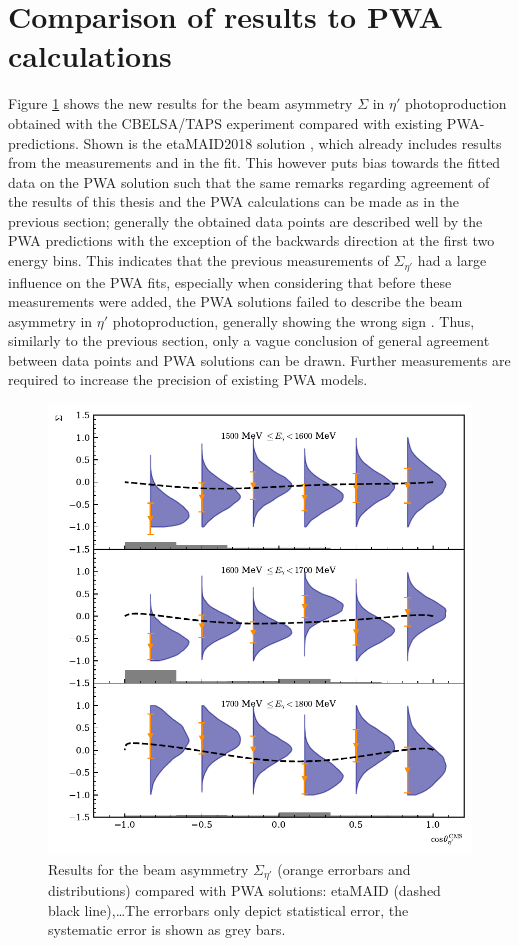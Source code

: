 \section{Comparison of results to PWA calculations}
Figure \ref{fig:pwa} shows the new results for the beam asymmetry $\Sigma$ in $\eta'$ photoproduction obtained with the CBELSA/TAPS experiment compared with existing PWA-predictions. Shown is the etaMAID2018 solution \cite{etaMAID}, which already includes results from the measurements \cite{collins} and \cite{thresh} in the fit. This however puts bias towards  the fitted data on the PWA solution such that the same remarks regarding agreement of the results of this thesis and the PWA calculations can be made as in the previous section; generally the obtained data points are described well by the PWA predictions with the exception of the backwards direction at the first two energy bins. This indicates that the previous measurements of $\Sigma_{\eta'}$ had a large influence on the PWA fits, especially when considering that before these measurements were added, the PWA solutions failed to describe the beam asymmetry in $\eta'$ photoproduction, generally showing the wrong sign \cite{collins}. Thus, similarly to the previous section, only a vague conclusion of general agreement between data points and PWA solutions can be drawn. Further measurements are required to increase the precision of existing PWA models.

\begin{figure}[htbp]
\centering
\includegraphics[width=\linewidth]{../bayes/etap_event_based_fit/plots/sigma_etap_pwa.pdf}
\caption{Results for the beam asymmetry $\Sigma_{\eta'}$ (orange errorbars and distributions) compared with PWA solutions:  etaMAID \cite{etaMAID}(dashed black line),\dots The errorbars only depict statistical error, the systematic error is shown as grey bars.}
\label{fig:pwa}
\end{figure}
